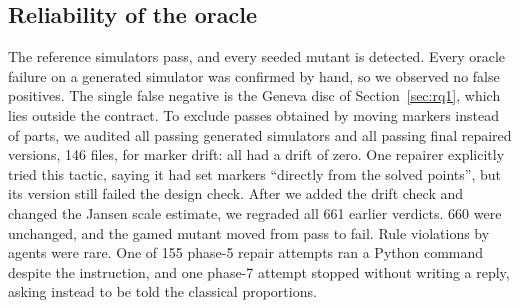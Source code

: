 \subsection{Reliability of the oracle}\label{sec:reliability}
The reference simulators pass, and every seeded mutant is detected. Every oracle failure on a generated simulator was confirmed by hand, so we observed no false positives. The single false negative is the Geneva disc of Section~\ref{sec:rq1}, which lies outside the contract. To exclude passes obtained by moving markers instead of parts, we audited all passing generated simulators and all passing final repaired versions, 146 files, for marker drift: all had a drift of zero. One repairer explicitly tried this tactic, saying it had set markers ``directly from the solved points'', but its version still failed the design check. After we added the drift check and changed the Jansen scale estimate, we regraded all 661 earlier verdicts. 660 were unchanged, and the gamed mutant moved from pass to fail. Rule violations by agents were rare. One of 155 phase-5 repair attempts ran a Python command despite the instruction, and one phase-7 attempt stopped without writing a reply, asking instead to be told the classical proportions.
